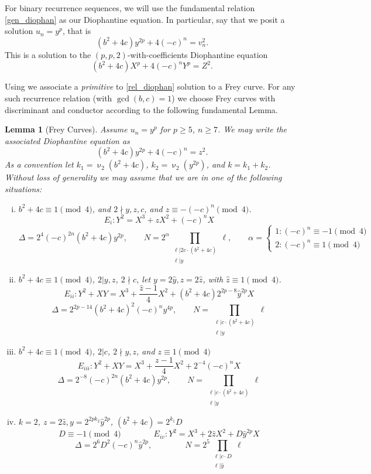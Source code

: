 \documentclass[12pt]{amsart}
\newtheorem{lem}[thm]{Lemma}
\theoremstyle{definition}
\newcommand{\notdiv}{\nmid}
\begin{document}
For binary recurrence sequences, we will use the fundamental relation \eqref{gen_diophan} as our Diophantine equation.  In particular, say that we posit a solution $u_n = y^p$, that is
\begin{equation}\label{rel_diophan} (b^2+4c)y^{2p}+4(-c)^n = v_n^2 .\end{equation}
This is a solution to the $(p,p,2)$-with-coefficients Diophantine equation
\[ (b^2+4c)X^p +4(-c)^nY^p = Z^2. \]

Using \cite{bennett04} we associate a \textit{primitive} to \eqref{rel_diophan} solution to a Frey curve.  For any such recurrence relation (with $\gcd(b,c)=1$) we choose Frey curves with discriminant and conductor according to the following fundamental Lemma.

\begin{lem}[Frey Curves]\label{freycurves}
Assume $u_n = y^p$ for $p\geq 5$, $n \geq 7$.  We may write the associated Diophantine equation as
\[ (b^2+4c)y^{2p} + 4(-c)^n = z^2.\]
As a convention let $k_1 = \upnu_2(b^2+4c)$, $k_2 = \upnu_2(y^{2p})$, and $k = k_1+k_2$.  Without loss of generality we may assume that we are in one of the following situations:



\begin{enumerate}[(i)]

\item $b^2+4c \equiv 1 \pmod{4}$, and $2 \notdiv y,z,c$, and $z \equiv -(-c)^n \pmod{4}$.
\[ E_i: Y^2 = X^3 + zX^2 + (-c)^nX \]
\[ \Delta = 2^4(-c)^{2n}(b^2+4c)y^{2p},  \qquad N = 2^{\alpha} \prod_{\substack{ \ell | 2c \cdot (b^2+4c) \\ \ell | y}} \ell, \qquad \alpha =  \begin{cases} 1: (-c)^n \equiv -1 \pmod{4}\\ 2 : (-c)^n \equiv 1 \pmod{4} \end{cases} \]
\item $b^2+4c \equiv 1 \pmod{4}$, $2|y,z$, $2 \notdiv c$, let $y = 2\hat{y}, z = 2\hat{z}$, with $\hat{z} \equiv 1 \pmod{4}$.
\[ E_{ii} : Y^2 +XY = X^3 + \frac{\hat{z} - 1}{4} X^2 + (b^2+4c)2^{2p-8}\hat{y}^{2p}X \]
\[ \Delta = 2^{2p-14}(b^2+4c)^2(-c)^ny^{4p}, \qquad N = \prod_{\substack{ \ell | c \cdot (b^2+4c) \\ \ell | y}} \ell  \]
\item $b^2+4c \equiv 1 \pmod{4}$, $2|c$, $2 \notdiv y,z$, and $z \equiv 1 \pmod{4}$
\[ E_{iii}: Y^2 +XY = X^3 +\frac{z-1}{4}X^2 +2^{-4}(-c)^nX \]
\[ \Delta = 2^{-8}(-c)^{2n}(b^2+4c)y^{2p} , \qquad N = \prod_{\substack{ \ell | c \cdot (b^2+4c) \\ \ell | y}} \ell  \]
\item $k = 2$, $z = 2 \hat{z}, y = 2^{2pk_2}\hat{y}^{2p}$, $(b^2+4c) = 2^{k_1}D$
\[D \equiv -1 \pmod{4} \qquad \qquad E_{iv} : Y^2 = X^3 +2\hat{z}X^2 +D\hat{y}^{2p}X \]
\[\Delta = 2^{6}D^2(-c)^n\hat{y}^{2p}, \qquad \qquad N = 2^{5}\prod_{\substack{ \ell | c \cdot D \\ \ell | \hat{y}}} \ell  \]


\end{enumerate}
\end{lem}
\end{document}
